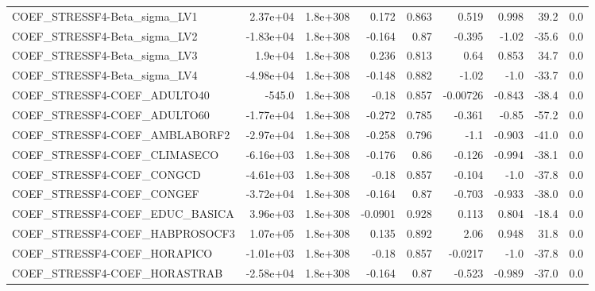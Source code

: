 \begin{tabular}{lrrrrrrrr}
COEF\_STRESSF4-Beta\_sigma\_LV1      &    2.37e+04 &     1.8e+308 &    0.172 &    0.863 &      0.519 &       0.998 &         39.2 &           0.0 \\
COEF\_STRESSF4-Beta\_sigma\_LV2      &   -1.83e+04 &     1.8e+308 &   -0.164 &     0.87 &     -0.395 &       -1.02 &        -35.6 &           0.0 \\
COEF\_STRESSF4-Beta\_sigma\_LV3      &     1.9e+04 &     1.8e+308 &    0.236 &    0.813 &       0.64 &       0.853 &         34.7 &           0.0 \\
COEF\_STRESSF4-Beta\_sigma\_LV4      &   -4.98e+04 &     1.8e+308 &   -0.148 &    0.882 &      -1.02 &        -1.0 &        -33.7 &           0.0 \\
COEF\_STRESSF4-COEF\_ADULTO40       &      -545.0 &     1.8e+308 &    -0.18 &    0.857 &   -0.00726 &      -0.843 &        -38.4 &           0.0 \\
COEF\_STRESSF4-COEF\_ADULTO60       &   -1.77e+04 &     1.8e+308 &   -0.272 &    0.785 &     -0.361 &       -0.85 &        -57.2 &           0.0 \\
COEF\_STRESSF4-COEF\_AMBLABORF2     &   -2.97e+04 &     1.8e+308 &   -0.258 &    0.796 &       -1.1 &      -0.903 &        -41.0 &           0.0 \\
COEF\_STRESSF4-COEF\_CLIMASECO      &   -6.16e+03 &     1.8e+308 &   -0.176 &     0.86 &     -0.126 &      -0.994 &        -38.1 &           0.0 \\
COEF\_STRESSF4-COEF\_CONGCD         &   -4.61e+03 &     1.8e+308 &    -0.18 &    0.857 &     -0.104 &        -1.0 &        -37.8 &           0.0 \\
COEF\_STRESSF4-COEF\_CONGEF         &   -3.72e+04 &     1.8e+308 &   -0.164 &     0.87 &     -0.703 &      -0.933 &        -38.0 &           0.0 \\
COEF\_STRESSF4-COEF\_EDUC\_BASICA    &    3.96e+03 &     1.8e+308 &  -0.0901 &    0.928 &      0.113 &       0.804 &        -18.4 &           0.0 \\
COEF\_STRESSF4-COEF\_HABPROSOCF3    &    1.07e+05 &     1.8e+308 &    0.135 &    0.892 &       2.06 &       0.948 &         31.8 &           0.0 \\
COEF\_STRESSF4-COEF\_HORAPICO       &   -1.01e+03 &     1.8e+308 &    -0.18 &    0.857 &    -0.0217 &        -1.0 &        -37.8 &           0.0 \\
COEF\_STRESSF4-COEF\_HORASTRAB      &   -2.58e+04 &     1.8e+308 &   -0.164 &     0.87 &     -0.523 &      -0.989 &        -37.0 &           0.0 \\

\end{tabular}
